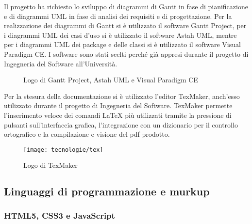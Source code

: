 Il progetto ha richiesto lo sviluppo di diagrammi di Gantt in fase di pianificazione e di diagrammi UML in fase di analisi dei requisiti e di progettazione. Per la realizzazione dei diagrammi di Gantt si è utilizzato il software Gantt Project, per i diagrammi UML dei casi d'uso si è utilizzato il software Astah UML, mentre per i diagrammi UML dei package e delle classi si è utilizzato il software Visual Paradigm CE. I software sono stati scelti perché già appresi durante il progetto di Ingegneria del Software all'Università.

\begin{figure}[!h] 
    \centering 
    \caption{Logo di Gantt Project, Astah UML e Visual Paradigm CE}
\end{figure}

Per la stesura della documentazione si è utilizzato l'editor TexMaker, anch'esso utilizzato durante il progetto di Ingegneria del Software. TexMaker permette l'inserimento veloce dei comandi \LaTeX{} più utilizzati tramite la pressione di pulsanti sull'interfaccia grafica, l'integrazione con un dizionario per il controllo ortografico e la compilazione e visione del pdf prodotto.

\begin{figure}[!h] 
    \centering 
    \texttt{[image: tecnologie/tex]} 
    \caption{Logo di TexMaker}
\end{figure}

\subsection{Linguaggi di programmazione e murkup}

\subsubsection{HTML5, CSS3 e JavaScript}


